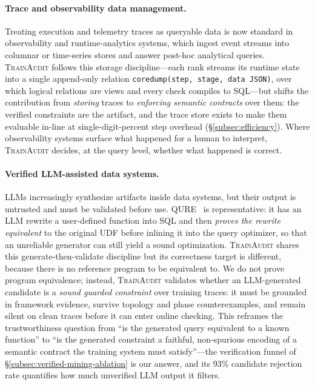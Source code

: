 \paragraph{Trace and observability data management.}
Treating execution and telemetry traces as queryable data is now standard in observability and runtime-analytics systems, which ingest event streams into columnar or time-series stores and answer post-hoc analytical queries. \textsc{TrainAudit} follows this storage discipline---each rank streams its runtime state into a single append-only relation \texttt{coredump(step, stage, data\,JSON)}, over which logical relations are views and every check compiles to SQL---but shifts the contribution from \emph{storing} traces to \emph{enforcing semantic contracts} over them: the verified constraints are the artifact, and the trace store exists to make them evaluable in-line at single-digit-percent step overhead (\S\ref{subsec:efficiency}). Where observability systems surface what happened for a human to interpret, \textsc{TrainAudit} decides, at the query level, whether what happened is correct.

\paragraph{Verified LLM-assisted data systems.}
LLMs increasingly synthesize artifacts inside data systems, but their output is untrusted and must be validated before use. QURE~\cite{qure} is representative: it has an LLM rewrite a user-defined function into SQL and then \emph{proves the rewrite equivalent} to the original UDF before inlining it into the query optimizer, so that an unreliable generator can still yield a sound optimization. \textsc{TrainAudit} shares this generate-then-validate discipline but its correctness target is different, because there is no reference program to be equivalent to. We do not prove program equivalence; instead, \textsc{TrainAudit} validates whether an LLM-generated candidate is a \emph{sound guarded constraint} over training traces: it must be grounded in framework evidence, survive topology and phase counterexamples, and remain silent on clean traces before it can enter online checking. This reframes the trustworthiness question from ``is the generated query equivalent to a known function'' to ``is the generated constraint a faithful, non-spurious encoding of a semantic contract the training system must satisfy''---the verification funnel of \S\ref{subsec:verified-mining-ablation} is our answer, and its 93\% candidate rejection rate quantifies how much unverified LLM output it filters.


